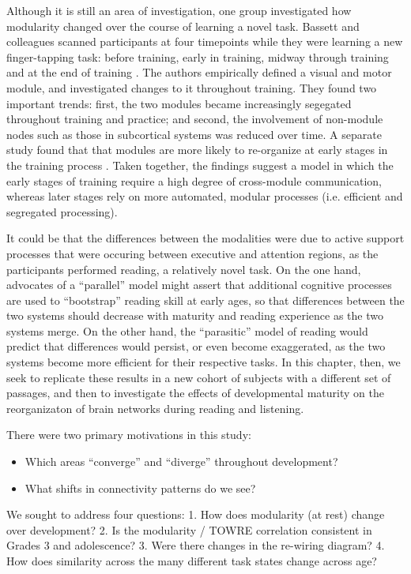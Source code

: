 Although it is still an area of investigation, one group investigated how modularity changed over the course of learning a novel task. Bassett and colleagues scanned participants at four timepoints while they were learning a new finger-tapping task: before training, early in training, midway through training and at the end of training \citep{Bassett2015}. The authors empirically defined a visual and motor module, and investigated changes to it throughout training. They found two important trends: first, the two modules became increasingly segegated throughout training and practice; and second, the involvement of non-module nodes such as those in subcortical systems was reduced over time. A separate study found that that modules are more likely to re-organize at early stages in the training process \citep{Bassett2011}. Taken together, the findings suggest a model in which the early stages of training require a high degree of cross-module communication, whereas later stages rely on more automated, modular processes (i.e. efficient and segregated processing). 

It could be that the differences between the modalities were due to active support processes that were occuring between executive and attention regions, as the participants performed reading, a relatively novel task. On the one hand, advocates of a ``parallel'' model might assert that additional cognitive processes are used to ``bootstrap'' reading skill at early ages, so that differences between the two systems should decrease with maturity and reading experience as the two systems merge. On the other hand, the ``parasitic'' model of reading would predict that differences would persist, or even become exaggerated, as the two systems become more efficient for their respective tasks. In this chapter, then, we seek to replicate these results in a new cohort of subjects with a different set of passages, and then to investigate the effects of developmental maturity on the reorganizaton of brain networks during reading and listening.

There were two primary motivations in this study:

\begin{itemize}
	\item Which areas ``converge'' and ``diverge'' throughout development?
	\item What shifts in connectivity patterns do we see?
\end{itemize} 

We sought to address four questions:
1. How does modularity (at rest) change over development?
2. Is the modularity / TOWRE correlation consistent in Grades 3 and adolescence?
3. Were there changes in the re-wiring diagram?
4. How does similarity across the many different task states change across age?



